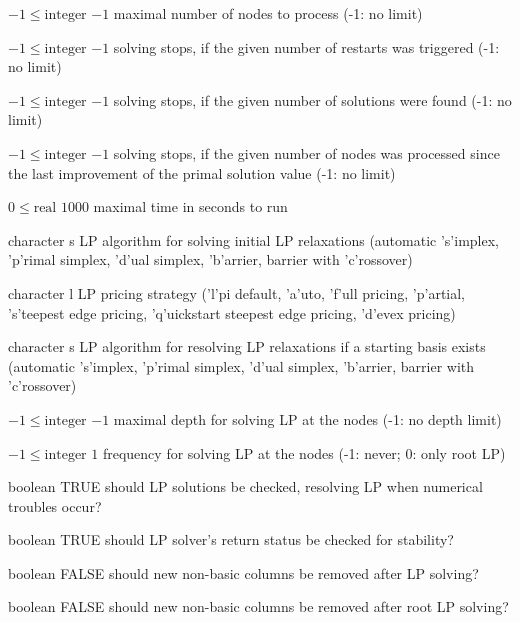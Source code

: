 %
{$-1\leq\textrm{integer}$}%
{$-1$}%
{maximal number of nodes to process (-1: no limit)}%
{}

%
{$-1\leq\textrm{integer}$}%
{$-1$}%
{solving stops, if the given number of restarts was triggered (-1: no limit)}%
{}

%
{$-1\leq\textrm{integer}$}%
{$-1$}%
{solving stops, if the given number of solutions were found (-1: no limit)}%
{}

%
{$-1\leq\textrm{integer}$}%
{$-1$}%
{solving stops, if the given number of nodes was processed since the last improvement of the primal solution value (-1: no limit)}%
{}

%
{$0\leq\textrm{real}$}%
{$1000$}%
{maximal time in seconds to run}%
{}

%
{character}%
{s}%
{LP algorithm for solving initial LP relaxations (automatic 's'implex, 'p'rimal simplex, 'd'ual simplex, 'b'arrier, barrier with 'c'rossover)}%
{}

%
{character}%
{l}%
{LP pricing strategy ('l'pi default, 'a'uto, 'f'ull pricing, 'p'artial, 's'teepest edge pricing, 'q'uickstart steepest edge pricing, 'd'evex pricing)}%
{}

%
{character}%
{s}%
{LP algorithm for resolving LP relaxations if a starting basis exists (automatic 's'implex, 'p'rimal simplex, 'd'ual simplex, 'b'arrier, barrier with 'c'rossover)}%
{}

%
{$-1\leq\textrm{integer}$}%
{$-1$}%
{maximal depth for solving LP at the nodes (-1: no depth limit)}%
{}

%
{$-1\leq\textrm{integer}$}%
{$1$}%
{frequency for solving LP at the nodes (-1: never; 0: only root LP)}%
{}

%
{boolean}%
{TRUE}%
{should LP solutions be checked, resolving LP when numerical troubles occur?}%
{}

%
{boolean}%
{TRUE}%
{should LP solver's return status be checked for stability?}%
{}

%
{boolean}%
{FALSE}%
{should new non-basic columns be removed after LP solving?}%
{}

%
{boolean}%
{FALSE}%
{should new non-basic columns be removed after root LP solving?}%
{}


